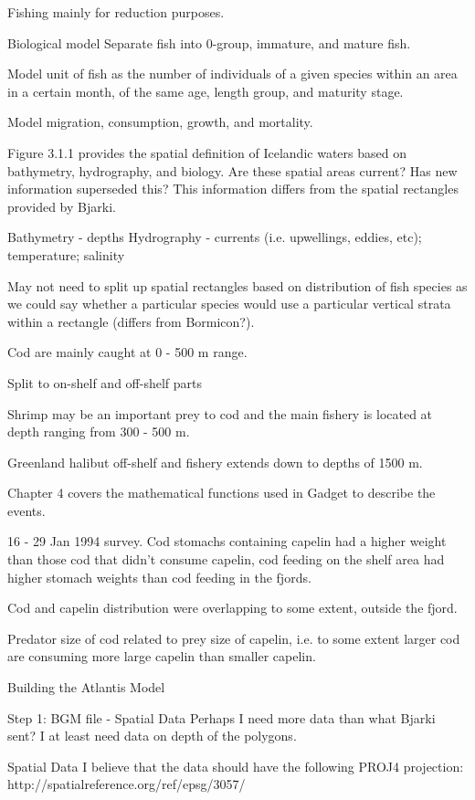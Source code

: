 \documentclass{report}
\begin{document}
Fishing mainly for reduction purposes.

Biological model
Separate fish into 0-group, immature, and mature fish.

Model unit of fish as the number of individuals of a given species within an area in a certain month, of the same age, length group, and maturity stage. 

Model migration, consumption, growth, and mortality.

Figure 3.1.1 provides the spatial definition of Icelandic waters based on bathymetry, hydrography, and biology. Are these spatial areas current? Has new information superseded this? This information differs from the spatial rectangles provided by Bjarki.

Bathymetry - depths
Hydrography - currents (i.e. upwellings, eddies, etc); temperature; salinity 

May not need to split up spatial rectangles based on distribution of fish species as we could say whether a particular species would use a particular vertical strata within a rectangle (differs from Bormicon?).

Cod are mainly caught at 0 - 500 m range.

Split to on-shelf and off-shelf parts

Shrimp may be an important prey to cod and the main fishery is located at depth ranging from 300 - 500 m. 

Greenland halibut off-shelf and fishery extends down to depths of 1500 m. 

Chapter 4 covers the mathematical functions used in Gadget to describe the events.

16 - 29 Jan 1994 survey. Cod stomachs containing capelin had a higher weight than those cod that didn’t consume capelin, cod feeding on the shelf area had higher stomach weights than cod feeding in the fjords. 

Cod and capelin distribution were overlapping to some extent, outside the fjord. 

Predator size of cod related to prey size of capelin, i.e. to some extent larger cod are consuming more large capelin than smaller capelin. 




Building the Atlantis Model

Step 1: BGM file - Spatial Data
Perhaps I need more data than what Bjarki sent? I at least need data on depth of the polygons.

Spatial Data
I believe that the data should have the following PROJ4 projection:
http://spatialreference.org/ref/epsg/3057/
\end{document}

